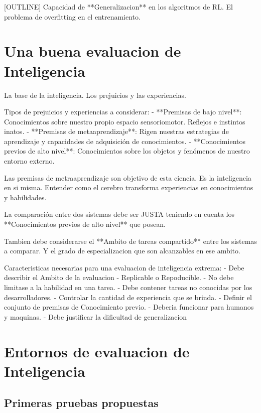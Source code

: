 [OUTLINE]
Capacidad de **Generalizacion** en los algoritmos de RL. El problema de overfitting en el entrenamiento.

\section{Una buena evaluacion de Inteligencia}\label{section:state-of-the-art:a-good-measure-of-inteligence}

La base de la inteligencia. Los prejuicios y las experiencias.

Tipos de prejuicios y experiencias a considerar:
- **Premisas de bajo nivel**: Conocimientos sobre nuestro propio espacio sensoriomotor. Reflejos e instintos inatos.
- **Premisas de metaaprendizaje**: Rigen nuestras estrategias de aprendizaje y capacidades de adquisición de conocimientos.
- **Conocimientos previos de alto nivel**: Conocimientos sobre los objetos y fenómenos de nuestro entorno externo.

Las premisas de metraaprendizaje son objetivo de esta ciencia. Es la inteligencia en si misma. Entender como el cerebro transforma experiencias en conocimientos y habilidades.

La comparación entre dos sistemas debe ser JUSTA teniendo en cuenta los **Conocimientos previos de alto nivel** que posean. 


Tambien debe considerarse el **Ambito de tareas compartido** entre los sistemas a comparar. Y el grado de especializacion que son alcanzables en ese ambito.

Caracteristicas necesarias para una evaluacion de inteligencia extrema:
- Debe describir el Ambito de la evaluacion
- Replicable o Repoducible.
- No debe limitase a la habilidad en una tarea.
- Debe contener tareas no conocidas por los desarrolladores.
- Controlar la cantidad de experiencia que se brinda.
- Definir el conjunto de premisas de Conocimiento previo.
- Deberia funcionar para humanos y maquinas.
- Debe justificar la dificultad de generalizacion

\section{Entornos de evaluacion de Inteligencia}\label{section:state-of-the-art:inteligence-evaluation-enviroments}

\subsection{Primeras pruebas propuestas}

